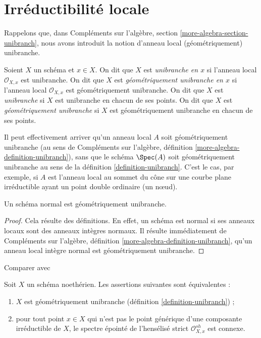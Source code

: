 \section{Irréductibilité locale}
\label{section-unibranch}

\noindent
Rappelons que, dans Compléments sur l'algèbre, section \ref{more-algebra-section-unibranch},
nous avons introduit la notion d'anneau local (géométriquement) unibranche.

\begin{definition}
\label{definition-unibranch}
\begin{reference}
\cite[Chapter IV (6.15.1)]{EGA4}
\end{reference}
Soient $X$ un schéma et $x \in X$. On dit que $X$ est {\it unibranche en $x$}
si l'anneau local $\mathcal{O}_{X, x}$ est unibranche. On dit que $X$ est
{\it géométriquement unibranche en $x$}
si l'anneau local $\mathcal{O}_{X, x}$ est géométriquement unibranche. On
dit que $X$ est {\it unibranche} si $X$ est unibranche en chacun de ses points. On
dit que $X$ est {\it géométriquement unibranche} si $X$ est
géométriquement unibranche en chacun de ses points.
\end{definition}

\noindent
Il peut effectivement arriver qu'un anneau local $A$ soit géométriquement unibranche
(au sens de
Compléments sur l'algèbre, définition \ref{more-algebra-definition-unibranch}),
sans que le schéma $\Spec(A)$ soit géométriquement unibranche au sens de
la définition \ref{definition-unibranch}. C'est le cas, par exemple,
si $A$ est l'anneau local au sommet du cône sur une courbe
plane irréductible ayant un point double ordinaire (un nœud).

\begin{lemma}
\label{lemma-normal-geometrically-unibranch}
Un schéma normal est géométriquement unibranche.
\end{lemma}

\begin{proof}
Cela résulte des définitions. En effet, un schéma est normal
si ses anneaux locaux sont des anneaux intègres normaux. Il résulte
immédiatement de Compléments sur l'algèbre, définition \ref{more-algebra-definition-unibranch},
qu'un anneau local intègre normal est géométriquement unibranche.
\end{proof}

\begin{lemma}
\label{lemma-geometrically-unibranch}
\begin{reference}
Comparer avec \cite[Proposition 2.3]{Etale-coverings}
\end{reference}
Soit $X$ un schéma noethérien. Les assertions suivantes sont équivalentes :
\begin{enumerate}
\item $X$ est géométriquement unibranche (définition \ref{definition-unibranch}) ;
\item pour tout point $x \in X$ qui n'est pas le point générique
d'une composante irréductible de $X$, le spectre épointé de
l'hensélisé strict $\mathcal{O}_{X, x}^{sh}$ est connexe.
\end{enumerate}
\end{lemma}

